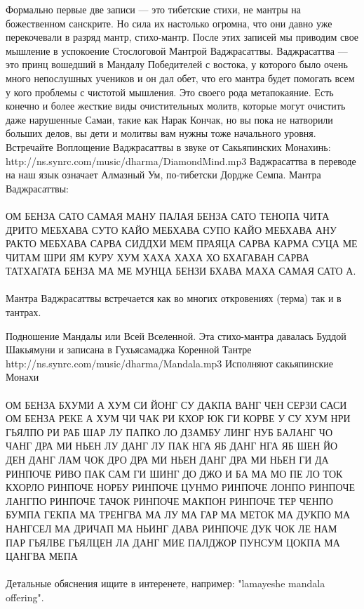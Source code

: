 Формально первые две записи — это тибетские стихи, не мантры
на божественном санскрите. Но сила их настолько огромна, что
они давно уже перекочевали в разряд мантр, стихо-мантр. После
этих записей мы приводим свое мышление в успокоение Стослоговой
Мантрой Ваджрасаттвы. Ваджрасаттва — это принц вошедший в Мандалу
Победителей с востока, у которого было очень много непослушных
учеников и он дал обет, что его мантра будет помогать всем у кого
проблемы с чистотой мышления. Это своего рода метапокаяние. Есть
конечно и более жесткие виды очистительных молитв, которые могут
очистить даже нарушенные Самаи, такие как Нарак Кончак, но вы пока
не натворили больших делов, вы дети и молитвы вам нужны тоже начального
уровня. Встречайте Воплощение Ваджрасаттвы в звуке от
Сакьяпинских Монахинь: http://ns.synrc.com/music/dharma/DiamondMind.mp3
Ваджрасаттва в переводе на наш язык означает Алмазный Ум, по-тибетски
Дордже Семпа. Мантра Ваджрасаттвы:
\\
\\
ОМ БЕНЗА САТО САМАЯ МАНУ ПАЛАЯ БЕНЗА САТО ТЕНОПА ЧИТА ДРИТО
МЕБХАВА СУТО КАЙО МЕБХАВА СУПО КАЙО МЕБХАВА АНУ РАКТО МЕБХАВА
САРВА СИДДХИ МЕМ ПРАЯЦА САРВА КАРМА СУЦА МЕ ЧИТАМ ШРИ ЯМ КУРУ
ХУМ ХАХА ХАХА ХО БХАГАВАН САРВА ТАТХАГАТА БЕНЗА МА МЕ МУНЦА
БЕНЗИ БХАВА МАХА САМАЯ САТО А.
\\
\\
Мантра Ваджрасаттвы встречается как во многих откровениях (терма) так и в тантрах.

Подношение Мандалы или Всей Вселенной. Эта стихо-мантра давалась
Буддой Шакьямуни и записана в Гухьясамаджа Коренной
Тантре http://ns.synrc.com/music/dharma/Mandala.mp3
Исполняют сакьяпинские Монахи
\\
\\
ОМ БЕНЗА БХУМИ А ХУМ СИ ЙОНГ СУ ДАКПА ВАНГ ЧЕН СЕРЗИ
САСИ ОМ БЕНЗА РЕКЕ А ХУМ ЧИ ЧАК РИ КХОР ЮК ГИ КОРВЕ
У СУ ХУМ НРИ ГЬЯЛПО РИ РАБ ШАР ЛУ ПАПКО ЛО ДЗАМБУ
ЛИНГ НУБ БАЛАНГ ЧО ЧАНГ ДРА МИ НЬЕН ЛУ ДАНГ ЛУ ПАК
НГА ЯБ ДАНГ НГА ЯБ ШЕН ЙО ДЕН ДАНГ ЛАМ ЧОК ДРО ДРА
МИ НЬЕН ДАНГ ДРА МИ НЬЕН ГИ ДА РИНПОЧЕ РИВО ПАК САМ
ГИ ШИНГ ДО ДЖО И БА МА МО ПЕ ЛО ТОК КХОРЛО РИНПОЧЕ
НОРБУ РИНПОЧЕ ЦУНМО РИНПОЧЕ ЛОНПО РИНПОЧЕ ЛАНГПО
РИНПОЧЕ ТАЧОК РИНПОЧЕ МАКПОН РИНПОЧЕ ТЕР ЧЕНПО
БУМПА ГЕКПА МА ТРЕНГВА МА ЛУ МА ГАР МА МЕТОК МА
ДУКПО МА НАНГСЕЛ МА ДРИЧАП МА НЬИНГ ДАВА РИНПОЧЕ
ДУК ЧОК ЛЕ НАМ ПАР ГЬЯЛВЕ ГЬЯЛЦЕН ЛА ДАНГ МИЕ ПАЛДЖОР
ПУНСУМ ЦОКПА МА ЦАНГВА МЕПА
\\
\\
Детальные обяснения ищите в интеренете, например: "lamayeshe mandala offering".


